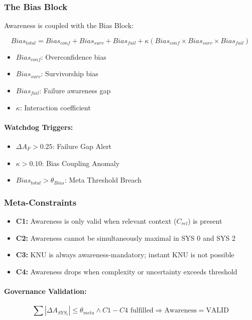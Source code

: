 \subsubsection{The Bias Block}

Awareness is coupled with the Bias Block:

\begin{equation}
Bias_{total} = Bias_{conf} + Bias_{surv} + Bias_{fail} + \kappa(Bias_{conf} \times Bias_{surv} \times Bias_{fail})
\end{equation}

\begin{itemize}
\item $Bias_{conf}$: Overconfidence bias
\item $Bias_{surv}$: Survivorship bias
\item $Bias_{fail}$: Failure awareness gap
\item $\kappa$: Interaction coefficient
\end{itemize}

\paragraph{Watchdog Triggers:}
\begin{itemize}
\item $\Delta A_F > 0.25$: Failure Gap Alert
\item $\kappa > 0.10$: Bias Coupling Anomaly
\item $Bias_{total} > \theta_{Bias}$: Meta Threshold Breach
\end{itemize}

\subsubsection{Meta-Constraints}

\begin{itemize}
\item \textbf{C1:} Awareness is only valid when relevant context ($C_{rel}$) is present
\item \textbf{C2:} Awareness cannot be simultaneously maximal in SYS 0 and SYS 2
\item \textbf{C3:} KNU is always awareness-mandatory; instant KNU is not possible
\item \textbf{C4:} Awareness drops when complexity or uncertainty exceeds threshold
\end{itemize}

\paragraph{Governance Validation:}
\begin{equation}
\sum |\Delta A_{SYS_i}| \leq \theta_{meta} \wedge C1-C4 \text{ fulfilled} \Rightarrow \text{Awareness} = \text{VALID}
\end{equation}

